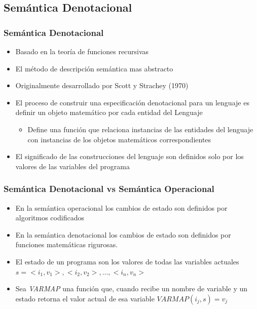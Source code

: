 \documentclass[11pt]{article}
\begin{document}
\subsection*{Semántica Denotacional}
\label{sec:orgcaf47ef}
\subsubsection*{Semántica Denotacional}
\label{sec:org3a1e310}
\begin{itemize}
\item Basado en la teoría de funciones recursivas
\item El método de descripción semántica mas abstracto
\item Originalmente desarrollado por Scott y Strachey (1970)
\item El proceso de construir una especificación denotacional para un
lenguaje es definir un objeto matemático por cada entidad del Lenguaje
\begin{itemize}
\item Define una función que relaciona instancias de las entidades del
lenguaje con instancias de los objetos matemáticos correspondientes
\end{itemize}
\item El significado de las construcciones del lenguaje son definidos solo
por los valores de las variables del programa
\end{itemize}

\subsubsection*{Semántica Denotacional vs Semántica Operacional}
\label{sec:org4cef103}
\begin{itemize}
\item En la semántica operacional los cambios de estado son definidos por
algoritmos codificados
\item En la semántica denotacional los cambios de estado son definidos por
funciones matemáticas rigurosas.
\item El estado de un programa son los valores de todas las variables
actuales  \(s = { < i_1,v_1 >,< i_2,v_2 >, ... ,< i_n,v_n > }\)
\item Sea  \emph{VARMAP} una función que, cuando recibe un nombre de variable y
un estado retorna el valor actual de esa variable \({VARMAP}(i_j, s) = v_j\)
\end{itemize}
\end{document}
